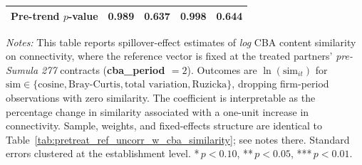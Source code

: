 \begin{table}[H]
\begin{tabular}{lcccc}
Pre-trend $p$-value & 0.989 & 0.637 & 0.998 & 0.644 \\
\hline\hline
\end{tabular}
\begin{minipage}{\linewidth}
\smallskip
\scriptsize\textit{Notes:} This table reports spillover-effect estimates of \emph{log} CBA content similarity on connectivity, where the reference vector is fixed at the treated partners' \textit{pre-Sumula 277} contracts (\textbf{cba\_period $= 2$}). Outcomes are $\ln(\text{sim}_{it})$ for $\text{sim} \in \{\text{cosine}, \text{Bray-Curtis}, \text{total variation}, \text{Ruzicka}\}$, dropping firm-period observations with zero similarity. The coefficient is interpretable as the percentage change in similarity associated with a one-unit increase in connectivity. Sample, weights, and fixed-effects structure are identical to Table~\ref{tab:pretreat_ref_uncorr_w_cba_similarity}; see notes there. Standard errors clustered at the establishment level. *\,$p<0.10$, **\,$p<0.05$, ***\,$p<0.01$.
\end{minipage}
\end{table}
